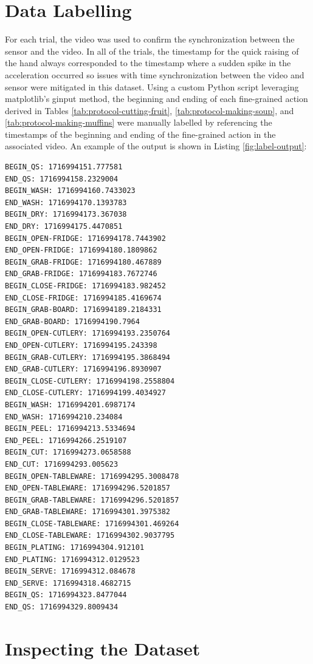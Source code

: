 \section{Data Labelling}
For each trial, the video was used to confirm the synchronization between the sensor and the video. In all of the trials, the timestamp for the quick raising of the hand always corresponded to the timestamp where a sudden spike in the acceleration occurred so issues with time synchronization between the video and sensor were mitigated in this dataset. Using a custom Python script leveraging matplotlib's ginput method, the beginning and ending of each fine-grained action derived in Tables \ref{tab:protocol-cutting-fruit}, \ref{tab:protocol-making-soup}, and \ref{tab:protocol-making-muffins} were manually labelled by referencing the timestamps of the beginning and ending of the fine-grained action in the associated video. An example of the output is shown in Listing \ref{fig:label-output}:


\begin{lstlisting}[label=fig:label-output, caption=Manual labelling output for the cutting fruit task.]
BEGIN_QS: 1716994151.777581
END_QS: 1716994158.2329004
BEGIN_WASH: 1716994160.7433023
END_WASH: 1716994170.1393783
BEGIN_DRY: 1716994173.367038
END_DRY: 1716994175.4470851
BEGIN_OPEN-FRIDGE: 1716994178.7443902
END_OPEN-FRIDGE: 1716994180.1809862
BEGIN_GRAB-FRIDGE: 1716994180.467889
END_GRAB-FRIDGE: 1716994183.7672746
BEGIN_CLOSE-FRIDGE: 1716994183.982452
END_CLOSE-FRIDGE: 1716994185.4169674
BEGIN_GRAB-BOARD: 1716994189.2184331
END_GRAB-BOARD: 1716994190.7964
BEGIN_OPEN-CUTLERY: 1716994193.2350764
END_OPEN-CUTLERY: 1716994195.243398
BEGIN_GRAB-CUTLERY: 1716994195.3868494
END_GRAB-CUTLERY: 1716994196.8930907
BEGIN_CLOSE-CUTLERY: 1716994198.2558804
END_CLOSE-CUTLERY: 1716994199.4034927
BEGIN_WASH: 1716994201.6987174
END_WASH: 1716994210.234084
BEGIN_PEEL: 1716994213.5334694
END_PEEL: 1716994266.2519107
BEGIN_CUT: 1716994273.0658588
END_CUT: 1716994293.005623
BEGIN_OPEN-TABLEWARE: 1716994295.3008478
END_OPEN-TABLEWARE: 1716994296.5201857
BEGIN_GRAB-TABLEWARE: 1716994296.5201857
END_GRAB-TABLEWARE: 1716994301.3975382
BEGIN_CLOSE-TABLEWARE: 1716994301.469264
END_CLOSE-TABLEWARE: 1716994302.9037795
BEGIN_PLATING: 1716994304.912101
END_PLATING: 1716994312.0129523
BEGIN_SERVE: 1716994312.084678
END_SERVE: 1716994318.4682715
BEGIN_QS: 1716994323.8477044
END_QS: 1716994329.8009434
\end{lstlisting}

\clearpage
\section{Inspecting the Dataset}

